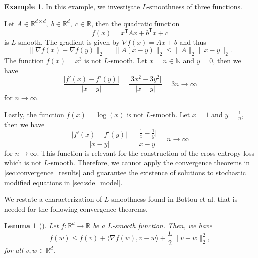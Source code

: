 \documentclass[12pt]{article}
\newtheorem{lemma}[lemma]{Lemma}
\theoremstyle{definition}
\newtheorem{example}[example]{Example}
\numberwithin{equation}{section}
\newcommand{\N}{\mathbb{N}}
\newcommand{\R}{\mathbb{R}}
\newcommand{\T}{\mathsf{T}}
\newcommand{\norm}[1]{\lVert{#1}\rVert_2}
\begin{document}
\begin{example}
  In this example, we investigate $L$-smoothness of three functions. 

  Let $A \in \R^{d \times d},\; b \in \R^d,\; c \in \R$, then the quadratic function
  \begin{equation*}
    f(x) = x^\T A x + b^\T x + c
  \end{equation*}
  is $L$-smooth. The gradient is given by $\nabla f(x)  = Ax + b$ and thus
  \begin{equation*}
    \norm{\nabla f(x) - \nabla f(y)} = \norm{A(x-y)} \leq \norm{A} \norm{x-y}.
  \end{equation*}
  The function $f(x) = x^3$ is not $L$-smooth. Let $x = n \in \N$ and $y = 0$, then we have
  \begin{equation*}
    \frac{\lvert f'(x) - f'(y) \rvert}{\lvert x - y \rvert} = \frac{\lvert3x^2 - 3 y^2 \rvert}{\lvert x-y \rvert} = 3n \rightarrow \infty
  \end{equation*}
  for $n \rightarrow \infty$.

  Lastly, the function $f(x) = \log(x)$ is not $L$-smooth. Let $x = 1$ and $y = \frac{1}{n}$, then we have
  \begin{equation*}
    \frac{\lvert f'(x) - f'(y) \rvert}{\lvert x - y \rvert} = \frac{\lvert \frac{1}{x}- \frac{1}{y} \rvert}{\lvert x-y \rvert} = n \rightarrow \infty
  \end{equation*}
  for $n \rightarrow \infty$. This function is relevant for the construction of the cross-entropy loss which is not $L$-smooth. Therefore, we cannot apply the convergence theorems in \autoref{sec:convergence_results} and guarantee the existence of solutions to stochastic modified equations in \autoref{sec:sde_model}.
\end{example}
We restate a characterization of $L$-smoothness found in Bottou et al.\cite{bottouOptimizationMethodsLargeScale2018} that is needed for the following convergence theorems.
\begin{lemma}[]
  Let $f : \R^d \rightarrow \R$ be a $L$-smooth function. Then, we have 
  \begin{equation}
    f(w) \leq f(v) + \langle \nabla f(w), v - w \rangle + \frac{L}{2} \norm{ v - w }^2,
  \end{equation}
  for all $v, w \in \R^d$.
\end{lemma}
\end{document}
